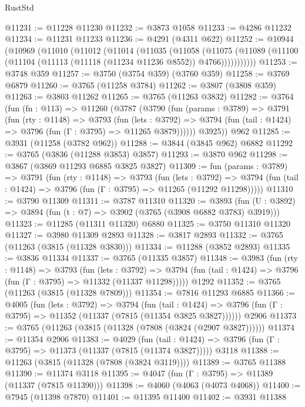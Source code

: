 \begin{lexlean}{RustStd}
\begin{coremodule}
@11231 := @11228 @11230
@11232 := @3873 @1058
@11233 := @4286 @11232
@11234 := @11231 @11233
@11236 := @4291 (@4311 @622)
@11252 := @10944
    (@10969
      (@11010
        (@11012
          (@11014
            (@11035
              (@11058
                (@11075
                  (@11089 (@11100 (@11104 (@11113 (@11118 (@11234 @11236 @8552)) @4766)))))))))))
@11253 := @3748 @359
@11257 := @3750 (@3754 @359) (@3760 @359)
@11258 := @3769 @6879
@11260 := @3765 (@11258 @3784)
@11262 := @3807 (@3808 @359)
@11263 := @3803 @11262
@11265 := @3765 (@11263 @3832)
@11282 := @3764
    (fun (fn : @113) =>
    @11260
      (@3787
        (@3790
          (fun (params : @3789) =>
          @3791
            (fun (rty : @1148) =>
            @3793
              (fun (lets : @3792) =>
              @3794 (fun (tail : @1424) => @3796 (fun (Γ : @3795) => @11265 @3879))))))
        @3925))
    @962
@11285 := @3931 (@11258 (@3782 @962))
@11288 := @3844 (@3845 @962) @6882
@11292 := @3765 (@3836 (@11288 @3853) @3857)
@11293 := @3870 @962
@11298 := @3867 (@3869 @11293 @6885 @3825 @3827)
@11309 := fun (params : @3789) =>
  @3791
    (fun (rty : @1148) =>
    @3793
      (fun (lets : @3792) =>
      @3794 (fun (tail : @1424) => @3796 (fun (Γ : @3795) => @11265 (@11292 @11298)))))
@11310 := @3790 @11309
@11311 := @3787 @11310
@11320 := @3893 (fun (U : @3892) => @3894 (fun (t : @7) => @3902 (@3765 (@3908 @6882 @3783) @3919)))
@11323 := @11285 (@11311 @11320) @6880
@11325 := @3750 @11310 @11320
@11327 := @3980 @11309 @2893
@11328 := @3817 @2893
@11332 := @3765 (@11263 (@3815 (@11328 @3830)))
@11334 := @11288 (@3852 @2893)
@11335 := @3836 @11334
@11337 := @3765 (@11335 @3857)
@11348 := @3983
    (fun (rty : @1148) =>
    @3793
      (fun (lets : @3792) =>
      @3794 (fun (tail : @1424) => @3796 (fun (Γ : @3795) => @11332 (@11337 @11298)))))
    @1292
@11352 := @3765 (@11263 (@3815 (@11328 @7809)))
@11354 := @7816 @11293 @6885
@11366 := @4005
    (fun (lets : @3792) =>
    @3794
      (fun (tail : @1424) =>
      @3796 (fun (Γ : @3795) => @11352 (@11337 (@7815 (@11354 @3825 @3827))))))
    @2906
@11373 := @3765 (@11263 (@3815 (@11328 (@7808 (@3824 (@2907 @3827))))))
@11374 := @11354 @2906
@11383 := @4029
    (fun (tail : @1424) => @3796 (fun (Γ : @3795) => @11373 (@11337 (@7815 (@11374 @3827)))))
    @3118
@11388 := @11263 (@3815 (@11328 (@7808 (@3824 @3119))))
@11389 := @3765 @11388
@11390 := @11374 @3118
@11395 := @4047 (fun (Γ : @3795) => @11389 (@11337 (@7815 @11390)))
@11398 := @4060 (@4063 (@4073 @4068))
@11400 := @7945 (@11398 @7870)
@11401 := @11395 @11400
@11402 := @3931 @11388

\end{coremodule}
\end{lexlean}
